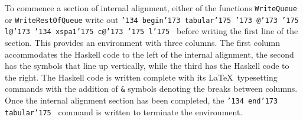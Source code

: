 To commence a section of internal alignment, either of the functions {\tt WriteQueue}
or {\tt WriteRestOfQueue} write out
{\tt \char'134 begin\char'173 tabular\char'175 \char'173 @\char'173 \char'175 l@\char'173 \char'134 xspa1\char'175 c@\char'173 \char'175 l\char'175 }
before writing the first line of the section.  This provides an environment
with three columns.  The first column accommodates the Haskell code to the left of the
internal alignment, the second has the symbols that line up vertically, while the third
has the Haskell code to the right.  The Haskell code is written complete with its \LaTeX\
typesetting commands with the addition of {\tt \&} symbols denoting the breaks between
columns.  Once the internal alignment section has been completed, the
{\tt \char'134 end\char'173 tabular\char'175 } command is written to terminate the
environment.